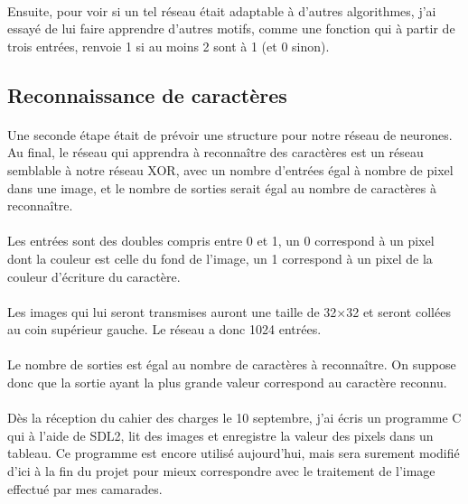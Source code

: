 \documentclass{article}
\begin{document}
\paragraph{}Ensuite, pour voir si un tel réseau était adaptable à d'autres algorithmes, j'ai essayé de lui faire apprendre d'autres motifs, comme une fonction qui à partir de trois entrées, renvoie 1 si au moins 2 sont à 1 (et 0 sinon).

\subsection{Reconnaissance de caractères}

\paragraph{}Une seconde étape était de prévoir une structure pour notre réseau de neurones.
Au final, le réseau qui apprendra à reconnaître des caractères est un réseau semblable à notre réseau XOR, avec un nombre d'entrées égal à nombre de pixel dans une image, et le nombre de sorties serait égal au nombre de caractères à reconnaître.

\paragraph{}Les entrées sont des doubles compris entre 0 et 1, un 0 correspond à un pixel dont la couleur est celle du fond de l'image, un 1 correspond à un pixel de la couleur d'écriture du caractère.

\paragraph{}Les images qui lui seront transmises auront une taille de 32×32 et seront collées au coin supérieur gauche. Le réseau a donc 1024 entrées.

\paragraph{}Le nombre de sorties est égal au nombre de caractères à reconnaître. On suppose donc que la sortie ayant la plus grande valeur correspond au caractère reconnu.

\paragraph{} Dès la réception du cahier des charges le 10 septembre, j'ai écris un programme C qui à l'aide de SDL2, lit des images et enregistre la valeur des pixels dans un tableau. Ce programme est encore utilisé aujourd'hui, mais sera surement modifié d'ici à la fin du projet pour mieux correspondre avec le traitement de l'image effectué par mes camarades.
\end{document}
